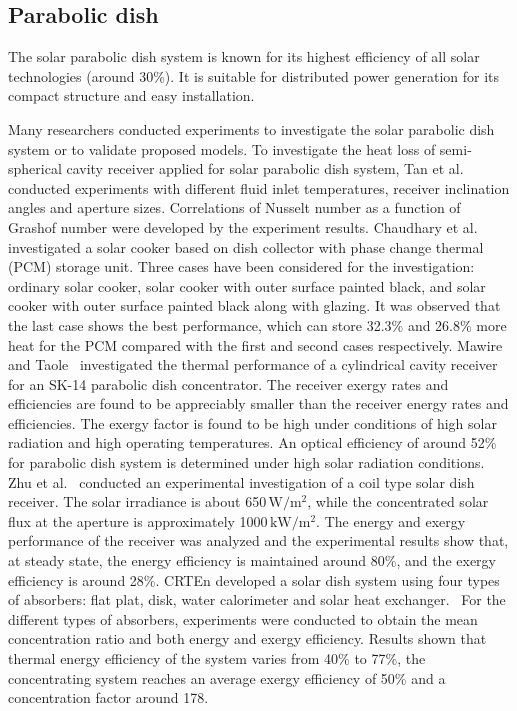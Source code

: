 \subsection{Parabolic dish}
\label{sec:pd}

The solar parabolic dish system is known for its highest efficiency of all solar technologies (around 30\%). It is suitable for distributed power generation for its compact structure and easy installation.  

Many researchers conducted experiments to investigate the solar parabolic dish system or to validate proposed models.
To investigate the heat loss of semi-spherical cavity receiver applied for solar parabolic dish system, Tan et al.~\cite{Tan2014b} conducted experiments with different fluid inlet temperatures, receiver inclination angles and aperture sizes. Correlations of Nusselt number as a function of Grashof number were developed by the experiment results.
Chaudhary et al.~\cite{Chaudhary2013} investigated a solar cooker based on dish collector with phase change thermal (PCM) storage unit. Three cases have been considered for the investigation: ordinary solar cooker, solar cooker with outer surface painted black, and solar cooker with outer surface painted black along with glazing. It was observed that the last case shows the best performance, which can store 32.3\% and 26.8\% more heat for the PCM compared with the first and second cases respectively.
Mawire and Taole~\cite{Mawire2014} investigated the thermal performance of a cylindrical cavity receiver for an SK-14 parabolic dish concentrator. The receiver exergy rates and efficiencies are found to be appreciably smaller than the receiver energy rates and efficiencies. The exergy factor is found to be high under conditions of high solar radiation and high operating temperatures. An optical efficiency of around 52\% for parabolic dish system is determined under high solar radiation conditions.
Zhu et al.~\cite{Zhu2015} conducted an experimental investigation of a coil type solar dish receiver. The solar irradiance is about 650$\,\mathrm{W/m^2}$, while the concentrated solar flux at the aperture is approximately 1000$\,\mathrm{kW/m^2}$. The energy and exergy performance of the receiver was analyzed and the experimental results show that, at steady state, the energy efficiency is maintained around 80\%, and the exergy efficiency is around 28\%. 
CRTEn developed a solar dish system using four types of absorbers: flat plat, disk, water calorimeter and solar heat exchanger.~\cite{Skouri2013} For the different types of absorbers, experiments were conducted to obtain the mean concentration ratio and both energy and exergy efficiency. Results shown that thermal energy efficiency of the system varies from 40\% to 77\%, the concentrating system reaches an average exergy efficiency of 50\% and a concentration factor around 178.
